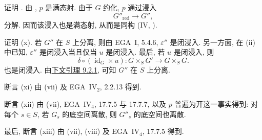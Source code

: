证明 \textup{}.
由 \textup{}, \(p\) 是满态射.
由于 \(G\) 约化, \(p\) 通过浸入
\[
  G''_{\mathrm{red}}\longrightarrow G'',
\]
分解. 因而该浸入也是满态射, 从而是同构
(IV, ).

证明 \textup{(x)}.
若 \(G''\) 在 \(S\) 上分离,
则由 EGA~I, 5.4.6, \(\varepsilon''\) 是闭浸入.
另一方面, 在 \textup{(ii)} 中已知,
\(\varepsilon''\) 是闭浸入当且仅当 \(u\) 是闭浸入.
最后, 若 \(u\) 是闭浸入, 则
\[
  \delta\circ(\operatorname{id}_G\times u):
    G\times_SG'\longrightarrow G\times_SG.
\]
也是闭浸入. 由\hyperref[lem:sga3-VIB-9.2.1]{下文引理 9.2.1},
可知 \(G''\) 在 \(S\) 上分离.

断言 \textup{(xi)} 由 \textup{(vii)} 及 EGA~IV\(_2\), 2.2.13 得到.

断言 \textup{(xii)} 由 \textup{(vii)},
EGA~IV\(_4\), 17.7.5 与 17.7.7,
以及 \(p\) 普遍为开这一事实得到:
对每个 \(s\in S\), 若 \(G_s\) 的底空间离散,
则 \(G''_s\) 的底空间也离散.

最后, 断言 \textup{(xiii)} 由 \textup{(vii)},
\textup{(viii)} 及 EGA~IV\(_4\), 17.7.5 得到.

